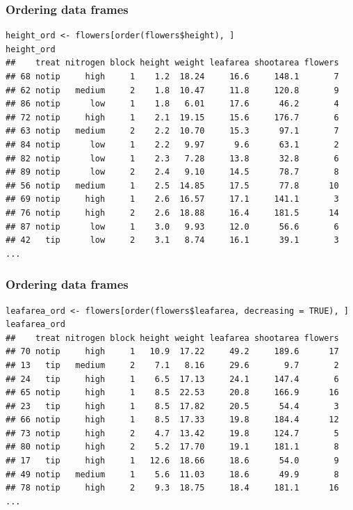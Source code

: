 \documentclass{beamer}
\newcommand{\bfr}[1]{\begin{frame}[fragile]\frametitle{{ #1 }}}
\begin{document}
\bfr{Ordering data frames}
\begin{verbatim}
height_ord <- flowers[order(flowers$height), ]        
height_ord
##    treat nitrogen block height weight leafarea shootarea flowers
## 68 notip     high     1    1.2  18.24     16.6     148.1       7
## 62 notip   medium     2    1.8  10.47     11.8     120.8       9
## 86 notip      low     1    1.8   6.01     17.6      46.2       4
## 72 notip     high     1    2.1  19.15     15.6     176.7       6
## 63 notip   medium     2    2.2  10.70     15.3      97.1       7
## 84 notip      low     1    2.2   9.97      9.6      63.1       2
## 82 notip      low     1    2.3   7.28     13.8      32.8       6
## 89 notip      low     2    2.4   9.10     14.5      78.7       8
## 56 notip   medium     1    2.5  14.85     17.5      77.8      10
## 69 notip     high     1    2.6  16.57     17.1     141.1       3
## 76 notip     high     2    2.6  18.88     16.4     181.5      14
## 87 notip      low     1    3.0   9.93     12.0      56.6       6
## 42   tip      low     2    3.1   8.74     16.1      39.1       3
...
\end{verbatim}
\end{frame}


\bfr{Ordering data frames}
\begin{verbatim}
leafarea_ord <- flowers[order(flowers$leafarea, decreasing = TRUE), ]        
leafarea_ord
##    treat nitrogen block height weight leafarea shootarea flowers
## 70 notip     high     1   10.9  17.22     49.2     189.6      17
## 13   tip   medium     2    7.1   8.16     29.6       9.7       2
## 24   tip     high     1    6.5  17.13     24.1     147.4       6
## 65 notip     high     1    8.5  22.53     20.8     166.9      16
## 23   tip     high     1    8.5  17.82     20.5      54.4       3
## 66 notip     high     1    8.5  17.33     19.8     184.4      12
## 73 notip     high     2    4.7  13.42     19.8     124.7       5
## 80 notip     high     2    5.2  17.70     19.1     181.1       8
## 17   tip     high     1   12.6  18.66     18.6      54.0       9
## 49 notip   medium     1    5.6  11.03     18.6      49.9       8
## 78 notip     high     2    9.3  18.75     18.4     181.1      16
...
\end{verbatim}
\end{frame}
\end{document}
